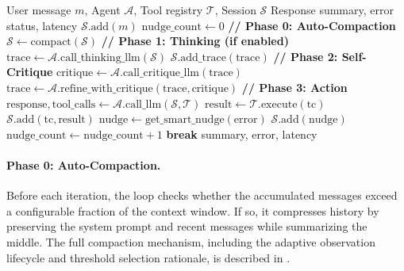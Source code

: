 \begin{algorithm}[t]
\caption{Extended Four-Phase ReAct Loop}
\label{alg:react}
\begin{algorithmic}[1]
\Require User message $m$, Agent $\mathcal{A}$, Tool registry $\mathcal{T}$, Session $\mathcal{S}$
\Ensure Response summary, error status, latency
\State $\mathcal{S}.\text{add}(m)$ 
\State $\text{nudge\_count} \gets 0$
\Repeat
    \State \textbf{// Phase 0: Auto-Compaction}
        \State $\mathcal{S} \gets \text{compact}(\mathcal{S})$ 
    \EndIf
    \State \textbf{// Phase 1: Thinking (if enabled)}
        \State $\text{trace} \gets \mathcal{A}.\text{call\_thinking\_llm}(\mathcal{S})$ 
        \State $\mathcal{S}.\text{add\_trace}(\text{trace})$
            \State \textbf{// Phase 2: Self-Critique}
            \State $\text{critique} \gets \mathcal{A}.\text{call\_critique\_llm}(\text{trace})$
            \State $\text{trace} \gets \mathcal{A}.\text{refine\_with\_critique}(\text{trace}, \text{critique})$
        \EndIf
    \EndIf
    \State \textbf{// Phase 3: Action}
    \State $\text{response}, \text{tool\_calls} \gets \mathcal{A}.\text{call\_llm}(\mathcal{S}, \mathcal{T})$ 
            \State $\text{result} \gets \mathcal{T}.\text{execute}(\text{tc})$
            \State $\mathcal{S}.\text{add}(\text{tc}, \text{result})$
        \EndFor
    \Else
            \State $\text{nudge} \gets \text{get\_smart\_nudge}(\text{error})$ 
            \State $\mathcal{S}.\text{add}(\text{nudge})$
            \State $\text{nudge\_count} \gets \text{nudge\_count} + 1$
        \Else
            \State \textbf{break} 
        \EndIf
    \EndIf
{}
\State \Return summary, error, latency
\end{algorithmic}
\end{algorithm}

\paragraph{Phase 0: Auto-Compaction.}
Before each iteration, the loop checks whether the accumulated messages exceed a configurable fraction of the context window. If so, it compresses history by preserving the system prompt and recent messages while summarizing the middle. The full compaction mechanism, including the adaptive observation lifecycle and threshold selection rationale, is described in .

